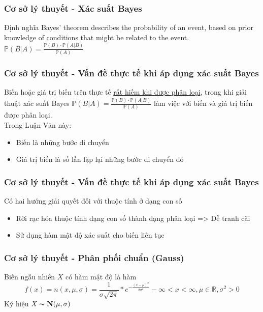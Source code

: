 \documentclass[t]{beamer}
\begin{document}

\begin{frame}[t]
\frametitle{Cơ sở lý thuyết - Xác suất Bayes}
\begin{block}{Định nghĩa}
Bayes’ theorem describes the probability of an event, based on prior knowledge of conditions that might be related to the event.\\
\center
$\mathbb{P}(B|A) = \frac{\mathbb{P}(B) \cdot \mathbb{P}(A|B)}{\mathbb{P}(A)}$
\end{block}
\end{frame}


\begin{frame}[t]
\frametitle{Cơ sở lý thuyết - Vấn đề thực tế khi áp dụng xác suất Bayes}
Biến hoặc giá trị biến trên thực tế \underline{rất hiếm khi được phân loại}, trong khi giải thuật xác suất Bayes $\mathbb{P}(B|A) = \frac{\mathbb{P}(B) \cdot \mathbb{P}(A|B)}{\mathbb{P}(A)}$ làm việc với biến và giá trị biến được phân loại.\\
Trong Luận Văn này:
\begin{itemize}
\item Biến là những bước di chuyển
\item Giá trị biến là số lần lặp lại những bước di chuyển đó
\end{itemize}
\end{frame}



\begin{frame}[t]
\frametitle{Cơ sở lý thuyết - Vấn đề thực tế khi áp dụng xác suất Bayes}
Có hai hướng giải quyết đối với thuộc tính ở dạng con số
\begin{itemize}
\item Rời rạc hóa thuộc tính dạng con số thành dạng phân loại => Dễ tranh cãi
\item Sử dụng hàm mật độ xác suất cho biến liên tục
\end{itemize}
\end{frame}


\begin{frame}[t]
\frametitle{Cơ sở lý thuyết - Phân phối chuẩn (Gauss)}
Biến ngẫu nhiên $\mathit{X}$ có hàm mật độ là hàm
\[
f(x)=n(x,\mu,\sigma)=\frac{1}{\sigma\sqrt{2\pi}} * e^{-\frac{(x-\mu)^2}{2\sigma^2}} -\infty < x < \infty, \mu \in \mathbb{R}, \sigma^2 > 0
\]
Ký hiệu $\mathit{X} \thicksim \textbf{N}(\mu,\sigma)$\\
\end{frame}
\end{document}
